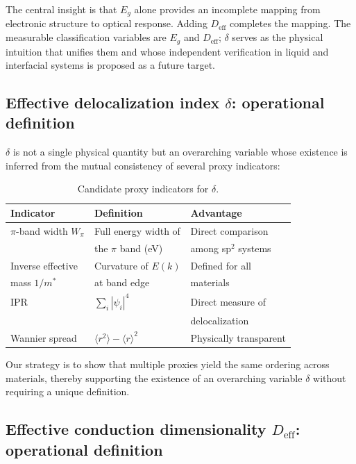 \documentclass[twocolumn,showpacs,preprintnumbers,amsmath,amssymb,prb]{revtex4-2}
\begin{document}
The central insight is that $E_g$ alone provides an incomplete mapping
from electronic structure to optical response. Adding $D_\mathrm{eff}$
completes the mapping. The measurable classification variables are
$E_g$ and $D_\mathrm{eff}$; $\delta$ serves as the physical intuition
that unifies them and whose independent verification in liquid and
interfacial systems is proposed as a future target.

\subsection{Effective delocalization index $\delta$: operational definition}

$\delta$ is not a single physical quantity but an overarching variable
whose existence is inferred from the mutual consistency of several proxy
indicators:

\begin{table}[h]
\caption{Candidate proxy indicators for $\delta$.}
\label{tab:delta_proxies}
\begin{ruledtabular}
\begin{tabular}{lll}
  Indicator & Definition & Advantage \\
  \hline
  $\pi$-band width $W_\pi$ & Full energy width of & Direct comparison \\
   & the $\pi$ band (eV) & among sp$^2$ systems \\
  Inverse effective & Curvature of $E(k)$ & Defined for all \\
  mass $1/m^*$ & at band edge & materials \\
  IPR & $\sum_i |\psi_i|^4$ & Direct measure of \\
   & & delocalization \\
  Wannier spread & $\langle r^2 \rangle - \langle r \rangle^2$ &
  Physically transparent \\
\end{tabular}
\end{ruledtabular}
\end{table}

Our strategy is to show that multiple proxies yield the same ordering
across materials, thereby supporting the existence of an overarching
variable $\delta$ without requiring a unique definition.

\subsection{Effective conduction dimensionality $D_\mathrm{eff}$:
  operational definition}
\label{sec:Deff}
\end{document}

